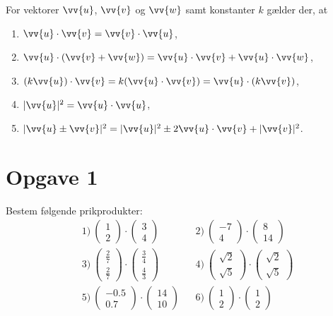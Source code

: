 \begin{setn}
\label{setn:1}
For vektorer $\vv{u}$, $\vv{v}$ og $\vv{w}$ samt konstanter $k$ gælder der, at 
\begin{enumerate}[label=\roman*)]
\item $\vv{u}\cdot \vv{v} = \vv{v}\cdot \vv{u}$,
\item $\vv{u} \cdot (\vv{v}+\vv{w}) = \vv{u} \cdot \vv{v}+ \vv{u}\cdot \vv{w}$,
\item $(k\vv{u})\cdot \vv{v} = k(\vv{u}\cdot \vv{v}) = \vv{u}\cdot (k\vv{v})$,
\item $|\vv{u}|^2 = \vv{u}\cdot \vv{u}$,
\item $|\vv{u}\pm \vv{v}|^2 = |\vv{u}|^2 \pm 2\vv{u}\cdot\vv{v} + |\vv{v}|^2 $.
\end{enumerate}
\end{setn}
\section{Opgave 1}
Bestem følgende prikprodukter:
\begin{align*}
&1) \ \begin{pmatrix}1\\ 2\end{pmatrix} \cdot \begin{pmatrix}3\\4\end{pmatrix}  &&2) \ \begin{pmatrix}-7\\ 4\end{pmatrix} \cdot \begin{pmatrix}8\\14\end{pmatrix}   \\
&3) \ \begin{pmatrix}\frac{2}{7}\\ \frac{2}{7}\end{pmatrix} \cdot \begin{pmatrix}\frac{3}{4}\\\frac{4}{3}\end{pmatrix}  &&4) \ \begin{pmatrix}\sqrt{2}\\ \sqrt{5}\end{pmatrix} \cdot \begin{pmatrix}\sqrt{2}\\ \sqrt{5}\end{pmatrix}   \\
&5) \ \begin{pmatrix}-0.5\\ 0.7\end{pmatrix} \cdot \begin{pmatrix}14\\10\end{pmatrix}  &&6) \  \begin{pmatrix}1\\ 2\end{pmatrix} \cdot \begin{pmatrix}1\\2\end{pmatrix}   \\ 
\end{align*}

